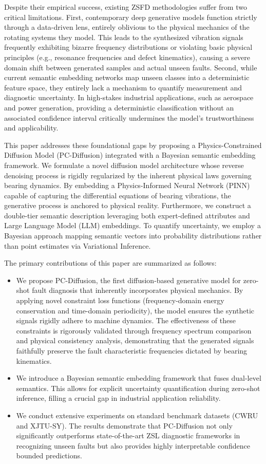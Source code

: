 Despite their empirical success, existing ZSFD methodologies suffer from two critical limitations. First, contemporary deep generative models function strictly through a data-driven lens, entirely oblivious to the physical mechanics of the rotating systems they model. This leads to the synthesized vibration signals frequently exhibiting bizarre frequency distributions or violating basic physical principles (e.g., resonance frequencies and defect kinematics), causing a severe domain shift between generated samples and actual unseen faults. Second, while current semantic embedding networks \cite{schonfeld2019cada} map unseen classes into a deterministic feature space, they entirely lack a mechanism to quantify measurement and diagnostic uncertainty. In high-stakes industrial applications, such as aerospace and power generation, providing a deterministic classification without an associated confidence interval critically undermines the model's trustworthiness and applicability.

This paper addresses these foundational gaps by proposing a Physics-Constrained Diffusion Model (PC-Diffusion) integrated with a Bayesian semantic embedding framework. We formulate a novel diffusion model architecture whose reverse denoising process is rigidly regularized by the inherent physical laws governing bearing dynamics. By embedding a Physics-Informed Neural Network (PINN) capable of capturing the differential equations of bearing vibrations, the generative process is anchored to physical reality. Furthermore, we construct a double-tier semantic description leveraging both expert-defined attributes and Large Language Model (LLM) embeddings. To quantify uncertainty, we employ a Bayesian approach mapping semantic vectors into probability distributions rather than point estimates via Variational Inference. 

The primary contributions of this paper are summarized as follows:
\begin{itemize}
    \item We propose PC-Diffusion, the first diffusion-based generative model for zero-shot fault diagnosis that inherently incorporates physical mechanics. By applying novel constraint loss functions (frequency-domain energy conservation and time-domain periodicity), the model ensures the synthetic signals rigidly adhere to machine dynamics. The effectiveness of these constraints is rigorously validated through frequency spectrum comparison and physical consistency analysis, demonstrating that the generated signals faithfully preserve the fault characteristic frequencies dictated by bearing kinematics.
    \item We introduce a Bayesian semantic embedding framework that fuses dual-level semantics. This allows for explicit uncertainty quantification during zero-shot inference, filling a crucial gap in industrial application reliability.
    \item We conduct extensive experiments on standard benchmark datasets (CWRU and XJTU-SY). The results demonstrate that PC-Diffusion not only significantly outperforms state-of-the-art ZSL diagnostic frameworks in recognizing unseen faults but also provides highly interpretable confidence bounded predictions.
\end{itemize}

